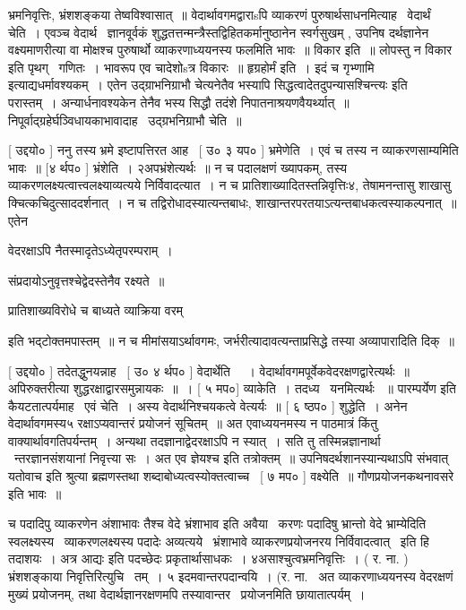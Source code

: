 \documentclass[11pt, openany]{book}
\begin{document}
भ्रमनिवृत्तिः, भ्रंशशङ्कया तेष्वविश्वासात्~॥ वेदार्थावगमद्वाराsपि
व्याकरणं पुरुषार्थसाधनमित्याह \textendash\ वेदार्थं चेति~। एवञ्च वेदार्थ \textendash\ 
ज्ञानवूर्वकं शुद्धतत्तन्मन्त्रैस्तद्विहितकर्मानुष्ठानेन स्वर्गसुखम् ,
उपनिष दर्थज्ञानेन वक्ष्यमाणरीत्या वा मोक्षश्च पुरुषार्थो
व्याकरणाध्ययनस्य फलमिति भावः~॥ विकार इति~॥ लोपस्तु न विकार इति
पृथग् \textendash\ गणितः~। भावरूप एव चादेशोsत्र विकारः~॥ हृग्रहोर्मं इति~। इदं च
गृभ्णामि इत्याद्यधर्मावश्यकम्~। एतेन {\qt उद्ग्राभनिग्राभौ चेत्यनेतैव
भस्यापि सिद्धत्वादेतदुपन्यासश्चिन्त्यः} इति परास्तम्~। अन्यार्धनावश्यकेन
तेनैव भस्य सिद्धौ तदंशे निपातनाश्रयणवैयर्थ्यात्~॥
निपूर्वाद्ग्रहेर्घञ्विधायकाभावादाह \textendash\ उद्ग्रभनिग्राभौ चेति~॥ 



 [ उद्दयो० ] ननु तस्य भ्रमे इष्टापत्तिरत आह \textendash\ [ उ० ३ यप० ]
भ्रमेणेति~। एवं च तस्य न व्याकरणसाम्यमिति भावः~॥ [४ र्थप० ]
भ्रंशेति~। २अपभ्रंशेत्यर्थः~॥ न च पदालक्षणं ख्यापकम्, तस्य
व्याकरणलक्ष्यत्वात्त्वलक्ष्याव्यत्यये निर्विवादत्यात~। न च
प्रातिशाख्यादितस्तन्निवृत्तिः४, तेषामनन्तासु शाखासु
क्चित्कचिदुत्साददर्शनात्~। न च तद्विरोधादस्यात्यन्तबाधः,
शाखान्तरपरतयाऽत्यन्तबाधकत्वस्याकल्पनात्~॥ एतेन \textendash\ 

 वेदरक्षाऽपि नैतस्मादृतेऽध्येतृपरम्पराम्~। 

 संप्रदायोऽनुवृत्तश्चेद्वेदस्तेनैव रक्ष्यते~॥ 

 प्रातिशाख्यविरोधे च बाध्यते व्याक्रिया वरम् 

 इति भद्टोक्तमपास्तम्~॥ न च मीमांसयाऽर्थावगमः,
जर्भरीत्यादावत्यन्ताप्रसिद्धे तस्या अव्यापारादिति दिक्~॥ 

 [ उद्दयो० ] तदेतद्धुनयन्नाह \textendash\ [ उ० ४ र्थप० ] वेदार्थेति \textendash\ ~। 
वेदार्थावगमपूर्वेकवेदरक्षणद्वारेत्यर्थः~॥ अपिरुक्तरीत्या
शुद्धरक्षाद्वारसमुन्नायकः~॥~। [ ५ मप०] व्याकेति~। तदध्य \textendash\ यनमित्यर्थः
~॥ {\qt पारम्पर्येण} इति कैयटतात्पर्यमाह \textendash\ एवं चेति~। अस्य वेदार्थनिश्चयकत्वे
वेत्यर्यः~॥ [ ६ ष्ठप० ] शुद्धेति~। अनेन वेदार्थावगमस्य५
रक्षाऽप्यवान्तरं प्रयोजनं सूचितम्~॥ अत एवाध्ययनमस्य न पाठमात्रं
किंतु वाक्यार्थावगतिपर्यन्तम्~। अन्यथा तदज्ञानाद्वेदरक्षाऽपि न स्यात्~। 
सति तु तस्मिन्नज्ञानार्था \textendash\ न्तरज्ञानसंशयानां निवृत्त्या सः~। अत एव
{\qt ज्ञेयश्च} इति तत्रोक्तम्~॥ उपनिषदर्थशानस्यान्यथाऽपि संभवात् {\qt यतोवाच}
इति श्रुत्या ब्रह्मणस्तथा शब्दाबोध्यत्वस्योक्तत्वाच्च \textendash\ [ ७ मप० ]
वक्ष्येति~॥ गौणप्रयोजनकथनावसरे इति भावः~॥ 



च पदादिपु व्याकरणेन अंशाभावः तैश्च वेदे भ्रंशाभाव इति अवैया \textendash\ करणः
पदादिषु भ्रान्तो वेदे भ्राम्येदिति स्वलक्ष्यस्य \textendash\ व्याकरणलक्ष्यस्य पदादेः
अव्यत्यये \textendash\ भ्रंशाभावे व्याकरणप्रयोजनरय निर्विवादत्वात् \textendash\ इति हि तदाशयः~। 
अत्र {\qt आद्यः} इति पदच्छेदः प्रकृतार्थासाधकः~। ४असाश्चुत्वभ्रमनिवृत्तिः~। 
( र. ना. ) भ्रंशशङ्काया निवृत्तिरित्युचि \textendash\ तम्~। ५ इदमवान्तरपदान्वयि~। 
(र. ना. \ अत व्याकरणाध्ययनस्य वेदरक्षणं मुख्यं प्रयोजनम्, तथा
वेदार्थज्ञानरक्षणमपि तस्यावान्तर \textendash\ प्रयोजनमिति छायातात्पर्यम्~। 
\end{document}
